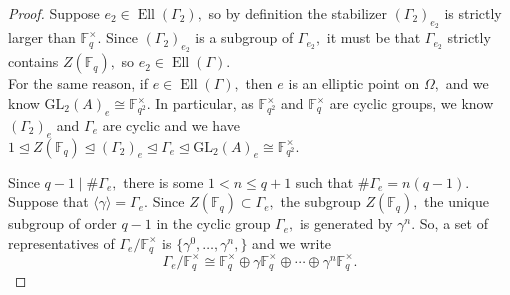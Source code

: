 \documentclass[11pt]{amsart}
\theoremstyle{definition}
\numberwithin{equation}{section}
\newcommand{\GL}{\mathrm{GL}} 	%
\newcommand{\bbF}{\mathbb{F}}		%
\begin{document}
		\begin{proof}
			Suppose $e_2\in \operatorname{Ell}(\Gamma_2),$ so by definition the stabilizer $(\Gamma_2)_{e_2}$ is strictly larger than $\bbF_q^{\times}.$ Since $(\Gamma_2)_{e_2}$ is a subgroup of $\Gamma_{e_2},$ it must be that $\Gamma_{e_2}$ strictly contains $Z(\bbF_q),$ so $e_2\in \operatorname{Ell}(\Gamma).$\\
			
			For the same reason, if $e\in \operatorname{Ell}(\Gamma),$ then $e$ is an elliptic point on $\Omega,$ and we know $\GL_2(A)_e\cong \bbF_{q^2}^{\times}.$  In particular, as $\bbF_{q^2}^{\times}$ and $\bbF_q^{\times}$ are cyclic groups, we know $(\Gamma_2)_e$ and $\Gamma_e$ are cyclic and we have $1\unlhd Z(\bbF_q)\unlhd (\Gamma_2)_e\unlhd \Gamma_e\unlhd \GL_2(A)_e\cong \bbF_{q^2}^{\times}.$ 
			
			Since $q-1\mid \#\Gamma_e,$ there is some $1<n\leq q+1$ such that $\#\Gamma_e=n(q-1).$ 
			Suppose that $\langle \gamma \rangle =\Gamma_e.$ Since $Z(\bbF_q)\subset \Gamma_e,$ the subgroup $Z(\bbF_q),$ the unique subgroup of order $q-1$ in the cyclic group $\Gamma_e,$ is generated by $\gamma^n.$ So, a set of representatives of $\Gamma_e/\bbF_q^{\times}$ is $\{\gamma^0,\ldots, \gamma^n,\}$ and we write 
			\[\Gamma_e/\bbF_q^{\times}\cong \bbF_q^{\times}\oplus \gamma\bbF_q^{\times}\oplus\cdots\oplus\gamma^n\bbF_q^{\times}.\]
			
			

\end{proof}
\end{document}

